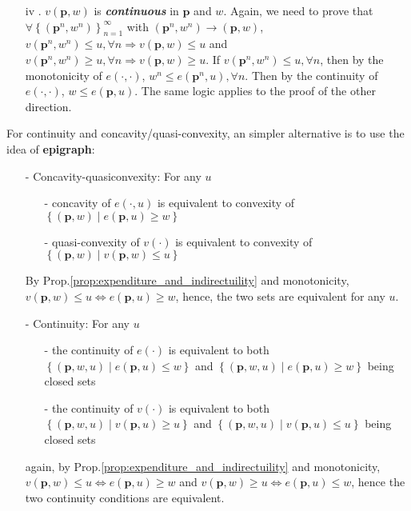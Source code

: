 \begin{enumerate}
\begin{enumerate}
        \item[iv] . $v(\mathbf{p},w)$ is \textit{\textbf{continuous}} in $\mathbf{p}$ and $w$. Again, we need to prove that $\forall \left\{\left( \mathbf{p}^n,w^n \right)\right\}^{\infty}_{n=1}$ with $\left(\mathbf{p}^n,w^n\right)\rightarrow (\mathbf{p},w)$, $v(\mathbf{p}^n,w^n)\leq u,\forall n\Rightarrow v(\mathbf{p},w)\leq u$ and $v(\mathbf{p}^n,w^n)\geq u,\forall n\Rightarrow v(\mathbf{p},w)\geq u$. If $v(\mathbf{p}^n,w^n)\leq u,\forall n$, then by the monotonicity of $e(\cdot,\cdot)$, $w^n\leq e(\mathbf{p}^n,u), \forall n$. Then by the continuity of $e(\cdot,\cdot)$, $w\leq e(\mathbf{p},u)$. The same logic applies to the proof of the other direction.
    \end{enumerate}
\end{enumerate}

For continuity and concavity/quasi-convexity, an simpler alternative is to use the idea of \textbf{epigraph}:
\begin{enumerate}
    \item[-] Concavity-quasiconvexity: For any $u$
    \begin{enumerate} 
        \item[-] concavity of $e(\cdot,u)$ is equivalent to convexity of $\left\{ (\mathbf{p},w)\mid e(\mathbf{p},u)\geq w \right\}$
        \item[-] quasi-convexity of $v(\cdot)$ is equivalent to convexity of $\left\{(\mathbf{p},w)\mid v(\mathbf{p},w)\leq u \right\}$ 
    \end{enumerate}
    By Prop.\ref{prop:expenditure_and_indirectuility} and monotonicity, $v(\mathbf{p},w)\leq u \Leftrightarrow e(\mathbf{p},u)\geq w$, hence, the two sets are equivalent for any $u$.
    \item[-] Continuity: For any $u$
    \begin{enumerate}
        \item[-] the continuity of $e(\cdot)$ is equivalent to both $\left\{(\mathbf{p},w,u)\mid e(\mathbf{p},u)\leq w\right\}$ and $\left\{(\mathbf{p},w,u)\mid e(\mathbf{p},u)\geq w\right\}$ being closed sets
        \item[-] the continuity of $v(\cdot)$ is equivalent to both $\left\{(\mathbf{p},w,u)\mid v(\mathbf{p},u)\geq u\right\}$ and $\left\{(\mathbf{p},w,u)\mid v(\mathbf{p},u)\leq u\right\}$ being closed sets
    \end{enumerate} 
    again, by Prop.\ref{prop:expenditure_and_indirectuility} and monotonicity, $v(\mathbf{p},w)\leq u \Leftrightarrow e(\mathbf{p},u)\geq w$ and $v(\mathbf{p},w)\geq u \Leftrightarrow e(\mathbf{p},u)\leq w$, hence the two continuity conditions are equivalent.
\end{enumerate}

